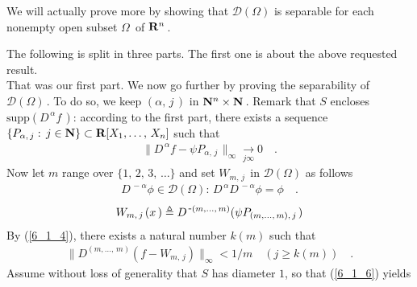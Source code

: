 We will actually prove more by showing that $\mathscr{D}(\Omega)$ is separable for each nonempty open subset $\Omega\,$ of ${\mathbf R}^n\,$. 

 The following is split in three parts. The first one is about the above requested result. \\


That was our first part. We now go further by proving the separability of $\mathscr{D}(\Omega)\,$. To do so, we keep $(\alpha,\, j\,)$ in ${\mathbf N}^n\times {\mathbf N}\,$. Remark that $S$ encloses $\text{supp}(D^{\, \alpha}f\,) $: according to the first part, there exists a sequence $\{ P_{\alpha,\, j}:\, j\in {\mathbf N} \}  \subset{\mathbf R} [X_1,\dotsc ,\, X_n]$ such that 
\begin{align}\label{6_1_4}
\|  D^{\, \alpha} f-  \psi P_{\alpha,\, j \,} \|_\infty \underset{j\infty}{\longrightarrow} 0 \quad . 
\end{align}
Now let $m$ range over $\{1,\, 2,\,3,\, \dots\}$ and set $W_{m,\, j\,}$ in $\mathscr{D}(\Omega)$ as follows
\begin{align}\label{6_1_5a}
D^{\,\minus \alpha} \phi \in \mathscr{D}(\Omega):\, D^{\,\alpha} D^{\,\minus \alpha} \phi= \phi\quad .
\end{align}
\begin{align}\label{6_1_5}
W_{m,\, j\,}(x\,)\triangleq D^{\,\text{\small{-}} (m,\dotsc,\,m)} ( \psi P_{(m,\dotsc, \, m),\, j\,})
                                                          \end{align}
By (\ref{6_1_4}), there exists a natural number $k(\!m)$ such that 
\begin{align}\label{6_1_6}
\|D^{(m,\dotsc,\, m)} (f   -W_{m,\, j})   \|_\infty < 1/m  \quad (j\geq k(\!m) )\quad  .
\end{align}
 Assume without loss of generality that $S$ has diameter $1$, so that (\ref{6_1_6}) yields
